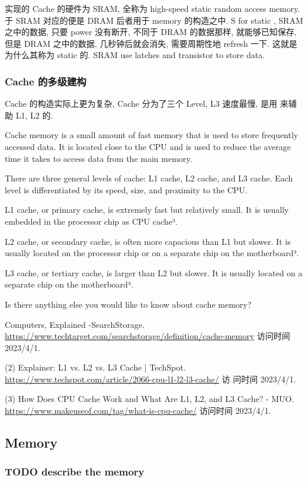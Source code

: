 \documentclass[11pt]{ctexart}
\begin{document}
实现的 Cache 的硬件为 SRAM, 全称为 high-speed static random access 
memory. 于 SRAM 对应的便是 DRAM 后者用于 memory 的构造之中. S for
static , SRAM 之中的数据, 只要 power 没有断开, 不同于 DRAM 的数据那样,
就能够已知保存, 但是 DRAM 之中的数据, 几秒钟后就会消失, 需要周期性地
refresh 一下. 这就是为什么其称为 static 的. SRAM use latches and transistor to store data. 
\subsubsection{Cache 的多级建构}
\label{sec:org5cbc3c6}
Cache 的构造实际上更为复杂, Cache 分为了三个 Level, L3 速度最慢, 是用
来辅助 L1, L2 的. 

Cache memory is a small amount of fast memory that is used to store frequently accessed data. It is located close to the CPU and is used to reduce the average time it takes to access data from the main memory.

There are three general levels of cache: L1 cache, L2 cache, and L3 cache. Each level is differentiated by its speed, size, and proximity to the CPU.

L1 cache, or primary cache, is extremely fast but relatively small. It is usually embedded in the processor chip as CPU cache³.

L2 cache, or secondary cache, is often more capacious than L1 but slower. It is usually located on the processor chip or on a separate chip on the motherboard³.

L3 cache, or tertiary cache, is larger than L2 but slower. It is usually located on a separate chip on the motherboard³.

Is there anything else you would like to know about cache memory?

Computers, Explained -SearchStorage. \url{https://www.techtarget.com/searchstorage/definition/cache-memory}
访问时间 2023/4/1.

(2) Explainer: L1 vs. L2 vs. L3 Cache |
TechSpot. \url{https://www.techspot.com/article/2066-cpu-l1-l2-l3-cache/} 访
问时间 2023/4/1.

(3) How Does CPU Cache Work and What Are L1, L2, and L3 Cache? -
MUO. \url{https://www.makeuseof.com/tag/what-is-cpu-cache/} 访问时间
2023/4/1.                                               


\subsection{Memory}
\label{sec:org3213d5b}
\subsubsection{{\bfseries\sffamily TODO} describe the memory}
\label{sec:orgd1afd63}
\end{document}
